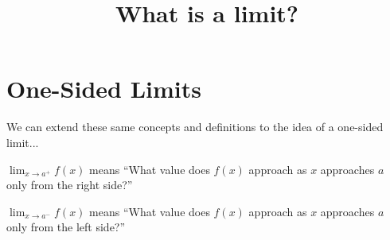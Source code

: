 \documentclass{ximera}
\title{What is a limit?}
\begin{document}
\section{One-Sided Limits}

We can extend these same concepts and definitions to the idea of a one-sided limit...

$\lim_{x \to a^+} f(x)$ means ``What value does $f(x)$ approach as $x$ approaches $a$ only from the right side?''

$\lim_{x \to a^-} f(x)$ means ``What value does $f(x)$ approach as $x$ approaches $a$ only from the left side?''
\end{document}
